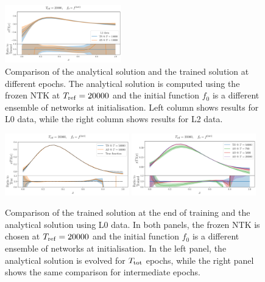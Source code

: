 \begin{figure}[ht!]
    \includegraphics[width=0.45\textwidth]{plots/analytical_solution/xT3/evolution/tr_vs_an/L2/linear/evolution_vs_trained_epoch_10000_L2_linear.pdf}
    \caption{Comparison of the analytical solution and the trained solution at
    different epochs. The analytical solution is computed using the frozen NTK
    at $T_{\rm ref} = 20000$ and the initial function $f_0$ is a different
    ensemble of networks at initialisation. Left column shows results for L0
    data, while the right column shows results for L2 data.}
    \label{fig:xT3_analytical_vs_trained}
  \end{figure}

\begin{figure}[ht!]
  \centering
  \includegraphics[width=0.48\textwidth]{plots/analytical_solution/xT3/evolution/from_f0/L0/linear/evolution_epoch_50000_L0_linear.pdf}
  \includegraphics[width=0.48\textwidth]{plots/analytical_solution/xT3/evolution/from_f0/L0/linear/evolution_epochs_700_5000_20000_L0_linear.pdf}
  \caption{Comparison of the trained solution at the end of training and
  the analytical solution using L0 data. In both panels, the
  frozen NTK is chosen at $T_{\rm ref} = 20000$ and the initial function $f_0$
  is a different ensemble of networks at initialisation. In the left panel,
  the analytical solution is evolved for $T_{\rm tot}$ epochs, while the right
  panel shows the same comparison for intermediate epochs.}
  \label{fig:xT3_analytical_init_L0}
\end{figure}


